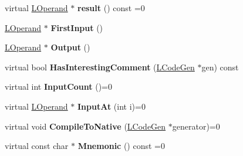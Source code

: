 \begin{DoxyCompactItemize}
\item 
virtual \hyperlink{classv8_1_1internal_1_1_l_operand}{L\+Operand} $\ast$ {\bfseries result} () const  =0\hypertarget{classv8_1_1internal_1_1_l_instruction_a3c5b856bb92c72dabcf08086abf6f8d7}{}\label{classv8_1_1internal_1_1_l_instruction_a3c5b856bb92c72dabcf08086abf6f8d7}

\item 
\hyperlink{classv8_1_1internal_1_1_l_operand}{L\+Operand} $\ast$ {\bfseries First\+Input} ()\hypertarget{classv8_1_1internal_1_1_l_instruction_ad9675d1c06250b28199f105835b80329}{}\label{classv8_1_1internal_1_1_l_instruction_ad9675d1c06250b28199f105835b80329}

\item 
\hyperlink{classv8_1_1internal_1_1_l_operand}{L\+Operand} $\ast$ {\bfseries Output} ()\hypertarget{classv8_1_1internal_1_1_l_instruction_ac4116b2faee2d8d3f0d7d21a27b40ad4}{}\label{classv8_1_1internal_1_1_l_instruction_ac4116b2faee2d8d3f0d7d21a27b40ad4}

\item 
virtual bool {\bfseries Has\+Interesting\+Comment} (\hyperlink{classv8_1_1internal_1_1_l_code_gen}{L\+Code\+Gen} $\ast$gen) const \hypertarget{classv8_1_1internal_1_1_l_instruction_affae35afdf10150a226c035d47b8ce27}{}\label{classv8_1_1internal_1_1_l_instruction_affae35afdf10150a226c035d47b8ce27}

\item 
virtual int {\bfseries Input\+Count} ()=0\hypertarget{classv8_1_1internal_1_1_l_instruction_a10b5af4413b64db11db6f4dc266b5e4f}{}\label{classv8_1_1internal_1_1_l_instruction_a10b5af4413b64db11db6f4dc266b5e4f}

\item 
virtual \hyperlink{classv8_1_1internal_1_1_l_operand}{L\+Operand} $\ast$ {\bfseries Input\+At} (int i)=0\hypertarget{classv8_1_1internal_1_1_l_instruction_a65f5b87101a6f411d73e5ba9aa13a675}{}\label{classv8_1_1internal_1_1_l_instruction_a65f5b87101a6f411d73e5ba9aa13a675}

\item 
virtual void {\bfseries Compile\+To\+Native} (\hyperlink{classv8_1_1internal_1_1_l_code_gen}{L\+Code\+Gen} $\ast$generator)=0\hypertarget{classv8_1_1internal_1_1_l_instruction_acab3d83fd0de1d783ce5e5e8651009dd}{}\label{classv8_1_1internal_1_1_l_instruction_acab3d83fd0de1d783ce5e5e8651009dd}

\item 
virtual const char $\ast$ {\bfseries Mnemonic} () const  =0\hypertarget{classv8_1_1internal_1_1_l_instruction_ae256d0dcc2d6017d8c49d382254dccee}{}\label{classv8_1_1internal_1_1_l_instruction_ae256d0dcc2d6017d8c49d382254dccee}


\end{DoxyCompactItemize}
